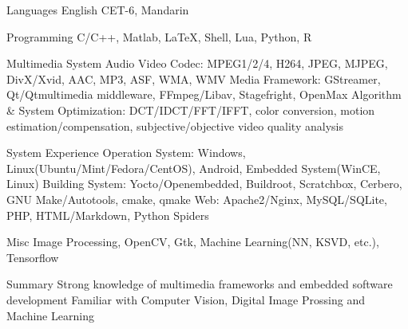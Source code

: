 
\begin{cvskills}
  \cvskill
    {Languages} %
    {English CET-6, Mandarin} %

  \cvskill
    {Programming} %
    {C/C++, Matlab, LaTeX, Shell, Lua, Python, R} %

  \cvskill
    {Multimedia System} %
    {Audio Video Codec: MPEG1/2/4, H264, JPEG, MJPEG, DivX/Xvid, AAC, MP3, ASF, WMA, WMV \newline
    Media Framework: GStreamer, Qt/Qtmultimedia middleware, FFmpeg/Libav, Stagefright, OpenMax \newline
    Algorithm \& System Optimization: DCT/IDCT/FFT/IFFT, color conversion, \newline motion estimation/compensation, subjective/objective video quality analysis} %

  \cvskill
    {System Experience} %
    {Operation System: Windows, Linux(Ubuntu/Mint/Fedora/CentOS), Android, \newline
    Embedded System(WinCE, Linux) \newline
    Building System: Yocto/Openembedded, Buildroot, Scratchbox, Cerbero, \newline
    GNU Make/Autotools, cmake, qmake \newline
    Web: Apache2/Nginx, MySQL/SQLite, PHP, HTML/Markdown, Python Spiders} %

  \cvskill
    {Misc} %
    {Image Processing, OpenCV, Gtk, Machine Learning(NN, KSVD, etc.), Tensorflow}

  \cvskill
    {Summary} %
    {Strong knowledge of multimedia frameworks and embedded software development \newline
     Familiar with Computer Vision, Digital Image Prossing and Machine Learning}

\end{cvskills}
